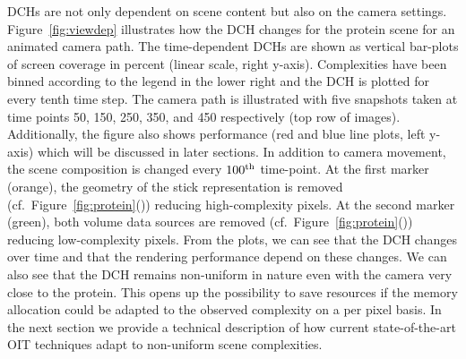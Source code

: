 \documentclass{egpubl}
\newcommand{\dch}{DCH}
\begin{document}
\dch{}s are not only dependent on scene content but also on the camera settings.
Figure~\ref{fig:viewdep} illustrates how the \dch{} changes for the protein scene for an animated camera path.
The time-dependent \dch{}s are shown as vertical bar-plots of screen coverage in percent (linear scale, right y-axis).
Complexities have been binned according to the legend in the lower right and the \dch{} is plotted for every tenth time step.
The camera path is illustrated with five snapshots taken at time points 50, 150, 250, 350, and 450 respectively (top row of images).
Additionally, the figure also shows performance (red and blue line plots, left y-axis) which will be discussed in later sections.
In addition to camera movement, the scene composition is changed every $100\textsuperscript{th}$ time-point.
At the first marker (orange), the geometry of the stick representation is removed (cf.~Figure~\ref{fig:protein}()) reducing high-complexity pixels. 
At the second marker (green), both volume data sources are removed (cf.~Figure~\ref{fig:protein}()) reducing low-complexity pixels. 
From the plots, we can see that the \dch{} changes over time and that the rendering performance depend on these changes.
We can also see that the \dch{} remains non-uniform in nature even with the camera very close to the protein.
This opens up the possibility to save resources if the memory allocation could be adapted to the observed complexity on a per pixel basis.
In the next section we provide a technical description of how current state-of-the-art OIT techniques adapt to non-uniform scene complexities. 


\newcommand{\bFraglist}{Fragment List}

\newcommand{\bTarget}{Render Target}
\newcommand{\bAnchor}{List Anchor}
\newcommand{\bPool}{Fragment Pool}
\newcommand{\bAtomic}{Atomic}
\newcommand{\bSemaphore}{Semaphore}
\newcommand{\bArray}{Local Array}
\newcommand{\bCounter}{Complexity Counter}
\end{document}
